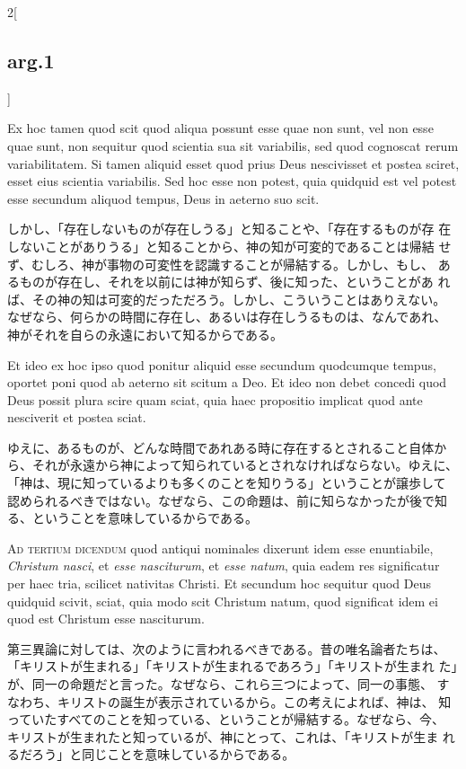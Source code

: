 \documentclass[paper=a4paper,fontsize=10pt,jafontsize=9pt,titlepage]{jlreq}
\begin{document}
\begin{paracol}{2}[\subsection{arg.1}]
\switchcolumn*

Ex hoc tamen quod scit quod aliqua possunt esse quae non sunt, vel non
esse quae sunt, non sequitur quod scientia sua sit variabilis, sed
quod cognoscat rerum variabilitatem. Si tamen aliquid esset quod prius
Deus nescivisset et postea sciret, esset eius scientia variabilis. Sed
hoc esse non potest, quia quidquid est vel potest esse secundum
aliquod tempus, Deus in aeterno suo scit.

\switchcolumn

しかし、「存在しないものが存在しうる」と知ることや、「存在するものが存
在しないことがありうる」と知ることから、神の知が可変的であることは帰結
せず、むしろ、神が事物の可変性を認識することが帰結する。しかし、もし、
あるものが存在し、それを以前には神が知らず、後に知った、ということがあ
れば、その神の知は可変的だっただろう。しかし、こういうことはありえない。
なぜなら、何らかの時間に存在し、あるいは存在しうるものは、なんであれ、
神がそれを自らの永遠において知るからである。

\switchcolumn*

Et ideo ex hoc ipso quod ponitur aliquid esse secundum quodcumque
tempus, oportet poni quod ab aeterno sit scitum a Deo. Et ideo non
debet concedi quod Deus possit plura scire quam sciat, quia haec
propositio implicat quod ante nesciverit et postea sciat.

\switchcolumn

ゆえに、あるものが、どんな時間であれある時に存在するとされること自体か
ら、それが永遠から神によって知られているとされなければならない。ゆえに、
「神は、現に知っているよりも多くのことを知りうる」ということが譲歩して
認められるべきではない。なぜなら、この命題は、前に知らなかったが後で知
る、ということを意味しているからである。

\switchcolumn*[\subsection{ad.3}]

{\scshape Ad tertium dicendum} quod antiqui nominales dixerunt idem
esse enuntiabile, {\itshape Christum nasci}, et {\itshape esse
nasciturum}, et {\itshape esse natum}, quia eadem res significatur per
haec tria, scilicet nativitas Christi. Et secundum hoc sequitur quod
Deus quidquid scivit, sciat, quia modo scit Christum natum, quod
significat idem ei quod est Christum esse nasciturum.

\switchcolumn

第三異論に対しては、次のように言われるべきである。昔の唯名論者たちは、
「キリストが生まれる」「キリストが生まれるであろう」「キリストが生まれ
た」が、同一の命題だと言った。なぜなら、これら三つによって、同一の事態、
すなわち、キリストの誕生が表示されているから。この考えによれば、神は、
知っていたすべてのことを知っている、ということが帰結する。なぜなら、今、
キリストが生まれたと知っているが、神にとって、これは、「キリストが生ま
れるだろう」と同じことを意味しているからである。


\end{paracol}
\end{document}
